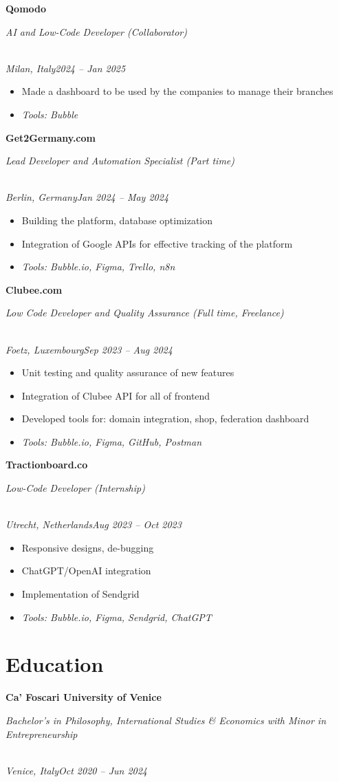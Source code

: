 \documentclass[a4paper,10pt]{article}
\newcommand{\role}[4]{\vspace{3pt}\noindent\hspace{0.6em}\parbox[t]{0.38\textwidth}{\raggedright\textbf{#1}}\hfill\parbox[t]{0.58\textwidth}{\raggedleft\textit{#2}}\\{\textit{#3}\hfill\textit{#4}}\vspace{1pt}}
\begin{document}
\role{Qomodo}{AI and Low-Code Developer (Collaborator)}{Milan, Italy}{2024 -- Jan 2025}
\begin{itemize}
\item Made a dashboard to be used by the companies to manage their branches
\item \textit{Tools: Bubble}
\end{itemize}

\role{Get2Germany.com}{Lead Developer and Automation Specialist (Part time)}{Berlin, Germany}{Jan 2024 -- May 2024}
\begin{itemize}
\item Building the platform, database optimization
\item Integration of Google APIs for effective tracking of the platform
\item \textit{Tools: Bubble.io, Figma, Trello, n8n}
\end{itemize}

\role{Clubee.com}{Low Code Developer and Quality Assurance (Full time, Freelance)}{Foetz, Luxembourg}{Sep 2023 -- Aug 2024}
\begin{itemize}
\item Unit testing and quality assurance of new features
\item Integration of Clubee API for all of frontend
\item Developed tools for: domain integration, shop, federation dashboard
\item \textit{Tools: Bubble.io, Figma, GitHub, Postman}
\end{itemize}

\role{Tractionboard.co}{Low-Code Developer (Internship)}{Utrecht, Netherlands}{Aug 2023 -- Oct 2023}
\begin{itemize}
\item Responsive designs, de-bugging
\item ChatGPT/OpenAI integration
\item Implementation of Sendgrid
\item \textit{Tools: Bubble.io, Figma, Sendgrid, ChatGPT}
\end{itemize}

\section{Education}
\role{Ca' Foscari University of Venice}{Bachelor's in Philosophy, International Studies \& Economics with Minor in Entrepreneurship}{Venice, Italy}{Oct 2020 -- Jun 2024}
\end{document}
